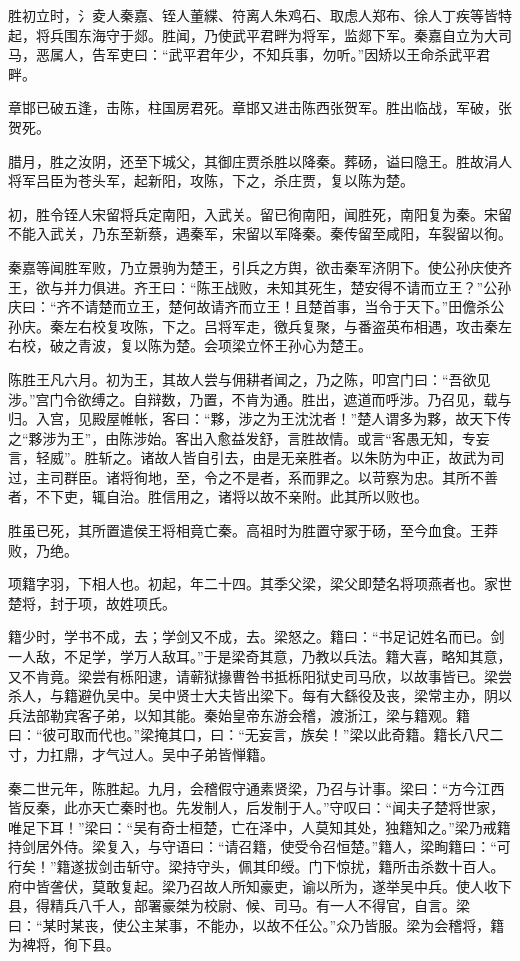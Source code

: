 \documentclass[]{article}
\begin{document}
胜初立时，氵夌人秦嘉、铚人董緤、符离人朱鸡石、取虑人郑布、徐人丁疾等皆特起，将兵围东海守于郯。胜闻，乃使武平君畔为将军，监郯下军。秦嘉自立为大司马，恶属人，告军吏曰：``武平君年少，不知兵事，勿听。''因矫以王命杀武平君畔。

章邯已破五逢，击陈，柱国房君死。章邯又进击陈西张贺军。胜出临战，军破，张贺死。

腊月，胜之汝阴，还至下城父，其御庄贾杀胜以降秦。葬砀，谥曰隐王。胜故涓人将军吕臣为苍头军，起新阳，攻陈，下之，杀庄贾，复以陈为楚。

初，胜令铚人宋留将兵定南阳，入武关。留已徇南阳，闻胜死，南阳复为秦。宋留不能入武关，乃东至新蔡，遇秦军，宋留以军降秦。秦传留至咸阳，车裂留以徇。

秦嘉等闻胜军败，乃立景驹为楚王，引兵之方舆，欲击秦军济阴下。使公孙庆使齐王，欲与并力俱进。齐王曰：``陈王战败，未知其死生，楚安得不请而立王？''公孙庆曰：``齐不请楚而立王，楚何故请齐而立王！且楚首事，当令于天下。''田儋杀公孙庆。秦左右校复攻陈，下之。吕将军走，徼兵复聚，与番盗英布相遇，攻击秦左右校，破之青波，复以陈为楚。会项梁立怀王孙心为楚王。

陈胜王凡六月。初为王，其故人尝与佣耕者闻之，乃之陈，叩宫门曰：``吾欲见涉。''宫门令欲缚之。自辩数，乃置，不肯为通。胜出，遮道而呼涉。乃召见，载与归。入宫，见殿屋帷帐，客曰：``夥，涉之为王沈沈者！''楚人谓多为夥，故天下传之``夥涉为王''，由陈涉始。客出入愈益发舒，言胜故情。或言``客愚无知，专妄言，轻威''。胜斩之。诸故人皆自引去，由是无亲胜者。以朱防为中正，故武为司过，主司群臣。诸将徇地，至，令之不是者，系而罪之。以苛察为忠。其所不善者，不下吏，辄自治。胜信用之，诸将以故不亲附。此其所以败也。

胜虽已死，其所置遣侯王将相竟亡秦。高祖时为胜置守冢于砀，至今血食。王莽败，乃绝。

项籍字羽，下相人也。初起，年二十四。其季父梁，梁父即楚名将项燕者也。家世楚将，封于项，故姓项氏。

籍少时，学书不成，去；学剑又不成，去。梁怒之。籍曰：``书足记姓名而已。剑一人敌，不足学，学万人敌耳。''于是梁奇其意，乃教以兵法。籍大喜，略知其意，又不肯竟。梁尝有栎阳逮，请蕲狱掾曹咎书抵栎阳狱史司马欣，以故事皆已。梁尝杀人，与籍避仇吴中。吴中贤士大夫皆出梁下。每有大繇役及丧，梁常主办，阴以兵法部勒宾客子弟，以知其能。秦始皇帝东游会稽，渡浙江，梁与籍观。籍曰：``彼可取而代也。''梁掩其口，曰：``无妄言，族矣！''梁以此奇籍。籍长八尺二寸，力扛鼎，才气过人。吴中子弟皆惮籍。

秦二世元年，陈胜起。九月，会稽假守通素贤梁，乃召与计事。梁曰：``方今江西皆反秦，此亦天亡秦时也。先发制人，后发制于人。''守叹曰：``闻夫子楚将世家，唯足下耳！''梁曰：``吴有奇士桓楚，亡在泽中，人莫知其处，独籍知之。''梁乃戒籍持剑居外侍。梁复入，与守语曰：``请召籍，使受令召恒楚。''籍人，梁眴籍曰：``可行矣！''籍遂拔剑击斩守。梁持守头，佩其印绶。门下惊扰，籍所击杀数十百人。府中皆詟伏，莫敢复起。梁乃召故人所知豪吏，谕以所为，遂举吴中兵。使人收下县，得精兵八千人，部署豪桀为校尉、候、司马。有一人不得官，自言。梁曰：``某时某丧，使公主某事，不能办，以故不任公。''众乃皆服。梁为会稽将，籍为裨将，徇下县。
\end{document}
